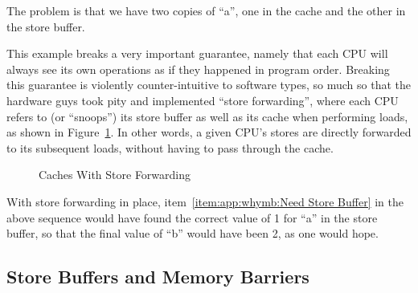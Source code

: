 The problem is that we have two copies of ``a'', one in the cache and
the other in the store buffer.

This example breaks a very important guarantee, namely that each CPU
will always see its own operations as if they happened in program order.
Breaking this guarantee is violently counter-intuitive to software types,
so much so
that the hardware guys took pity and implemented ``store forwarding'',
where each CPU refers to (or ``snoops'') its store buffer as well
as its cache when performing loads, as shown in
Figure~\ref{fig:app:whymb:Caches With Store Forwarding}.
In other words, a given CPU's stores are directly forwarded to its
subsequent loads, without having to pass through the cache.

\begin{figure}[htb]
\begin{center}
\end{center}
\caption{Caches With Store Forwarding}
\label{fig:app:whymb:Caches With Store Forwarding}
\end{figure}

With store forwarding in place, item~\ref{item:app:whymb:Need Store Buffer}
in the above sequence would have found the correct value of 1 for ``a'' in
the store buffer, so that the final value of ``b'' would have been 2,
as one would hope.

\subsection{Store Buffers and Memory Barriers}
\label{sec:app:whymb:Store Buffers and Memory Barriers}

